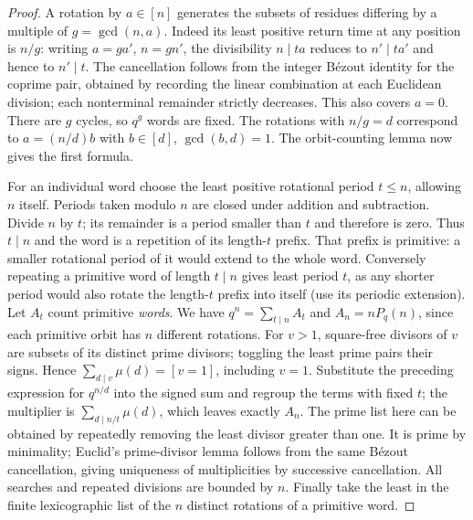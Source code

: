 \begin{proof}
A rotation by $a\in[n]$ generates the subsets of residues differing by a
multiple of $g=\gcd(n,a)$. Indeed its least positive return time at any
position is $n/g$: writing $a=ga'$, $n=gn'$, the divisibility $n\mid ta$
reduces to $n'\mid ta'$ and hence to $n'\mid t$. The cancellation follows
from the integer B\'ezout identity for the coprime pair, obtained by
recording the linear combination at each Euclidean division; each
nonterminal remainder strictly decreases. This also covers $a=0$.
There are $g$ cycles, so $q^g$ words are fixed. The rotations with
$n/g=d$ correspond to $a=(n/d)b$ with $b\in[d]$, $\gcd(b,d)=1$.
The orbit-counting lemma now gives the first formula.

For an individual word choose the least positive rotational period $t\le n$,
allowing $n$ itself. Periods taken modulo $n$ are closed under addition
and subtraction. Divide $n$ by $t$; its remainder is a period smaller than
$t$ and therefore is zero. Thus $t\mid n$ and the word is a repetition
of its length-$t$ prefix. That prefix is primitive: a smaller rotational
period of it would extend to the whole word. Conversely repeating a
primitive word of length $t\mid n$ gives least period $t$, as any shorter
period would also rotate the length-$t$ prefix into itself (use its
periodic extension). Let $A_t$ count primitive \emph{words}. We have
$q^n=\sum_{t\mid n}A_t$ and $A_n=nP_q(n)$, since each primitive orbit
has $n$ different rotations. For $v>1$, square-free divisors of $v$
are subsets of its distinct prime divisors; toggling the least prime
pairs their signs. Hence $\sum_{d\mid v}\mu(d)=[v=1]$, including $v=1$.
Substitute the preceding expression for $q^{n/d}$ into the signed sum
and regroup the terms with fixed $t$; the multiplier is
$\sum_{d\mid n/t}\mu(d)$, which leaves exactly $A_n$. The prime list here
can be obtained by repeatedly removing the least divisor greater than
one. It is prime by minimality; Euclid's prime-divisor lemma follows from
the same B\'ezout cancellation, giving uniqueness of multiplicities by
successive cancellation. All searches and repeated divisions are bounded
by $n$. Finally take the least in the finite lexicographic list of the
$n$ distinct rotations of a primitive word.
\end{proof}

